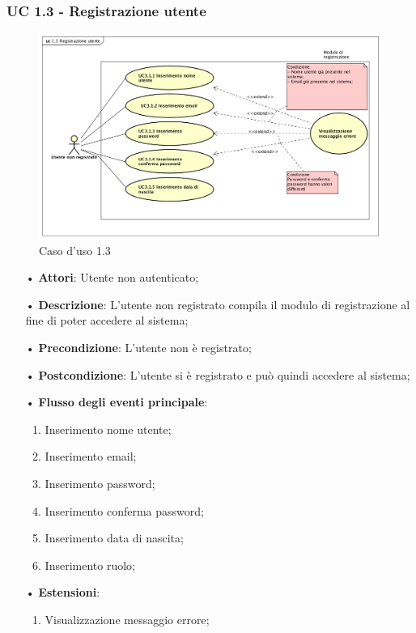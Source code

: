 \subsubsection{UC 1.3 - Registrazione utente}
\begin{figure}[H]
	\centering
	\includegraphics[width=17cm]{img/UC13.png} 
	\caption{Caso d'uso 1.3}\label{fig:13}
\end{figure}
\begin{itemize}
	\item[•]\textbf{Attori}: Utente non autenticato;
	\item[•]\textbf{Descrizione}: L'utente non registrato compila il modulo di registrazione al fine di poter accedere al sistema;
	\item[•]\textbf{Precondizione}: L'utente non è registrato;
	\item[•]\textbf{Postcondizione}: L'utente si è registrato e può quindi accedere al sistema;
	\item[•]\textbf{Flusso degli eventi principale}:
	\begin{enumerate}
		\item Inserimento nome utente;
		\item Inserimento email;
		\item Inserimento password;
		\item Inserimento conferma password;
		\item Inserimento data di nascita;
		\item Inserimento ruolo;
	\end{enumerate}
	\item[•]\textbf{Estensioni}:
	\begin{enumerate}
		\item Visualizzazione messaggio errore;
	\end{enumerate}
\end{itemize}

